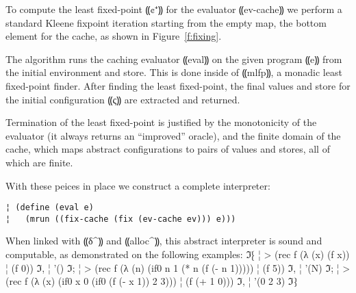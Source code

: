 To compute the least fixed-point ⸨¢⁺⸩ for the evaluator ⸨ev-cache⸩ we perform a
standard Kleene fixpoint iteration starting from the empty map, the bottom
element for the cache, as shown in Figure~\ref{f:fixing}.

The algorithm runs the caching evaluator ⸨eval⸩ on the given program ⸨e⸩ from
the initial environment and store. This is done inside of ⸨mlfp⸩, a monadic
least fixed-point finder. After finding the least fixed-point, the final values
and store for the initial configuration ⸨ς⸩ are extracted and returned.

Termination of the least fixed-point is justified by the monotonicity of the
evaluator (it always returns an “improved” oracle), and the finite domain of
the cache, which maps abstract configurations to pairs of values and stores,
all of which are finite.

With these peices in place we construct a complete interpreter:
\begin{lstlisting}
¦ (define (eval e)
¦   (mrun ((fix-cache (fix (ev-cache ev))) e)))
\end{lstlisting}
When linked with ⸨δ^⸩ and ⸨alloc^⸩, this abstract interpreter is sound and
computable, as demonstrated on the following examples:
ℑ⁅
¦ > (rec f (λ (x) (f x))
¦     (f 0))
ℑ,
¦ '()
ℑ;
¦ > (rec f (λ (n) (if0 n 1 (* n (f (- n 1)))))
¦     (f 5))
ℑ,
¦ '(N)
ℑ;
¦ > (rec f (λ (x) (if0 x 0 (if0 (f (- x 1)) 2 3)))
¦      (f (+ 1 0)))
ℑ,
¦ '(0 2 3)
ℑ⁆

